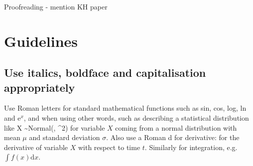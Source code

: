 \begin{frame}
\frametitle{}
\bi
  \item
\ei
\end{frame}


\begin{frame}
\frametitle{}
\bi
  \item
\ei
\end{frame}


\begin{frame}
\frametitle{}
\bi
  \item
\ei
\end{frame}


\begin{frame}
\frametitle{}
\bi
  \item
\ei
\end{frame}


\begin{frame}
\frametitle{}
\bi
  \item
\ei
\end{frame}







Proofreading - mention KH paper





\section*{Guidelines}


\subsection*{Use italics, boldface and capitalisation appropriately}


Use Roman letters for standard mathematical functions such as sin, cos, log, ln
and e$^x$, and
when using other words, such as describing a statistical distribution like
\eb
X \sim \mbox{Normal}(\mu, \sigma^2)
\label{Xnormal}
\ee
for variable $X$ coming from a normal distribution with mean $\mu$ and
standard deviation $\sigma$.
Also use a Roman d for derivative:
\eb
{}
\ee
for the derivative of variable $X$ with respect to time $t$. Similarly for
integration, e.g.~$\int f(x) \mbox{d}x$.

